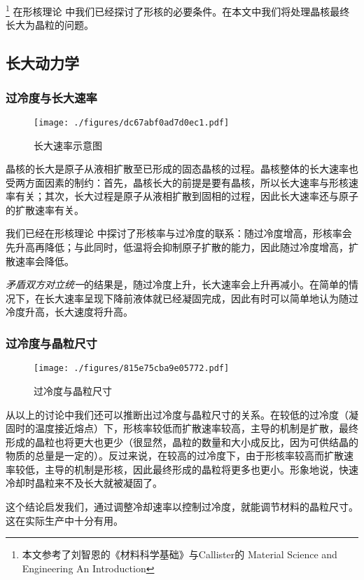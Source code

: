 
\footnote{本文参考了刘智恩的《材料科学基础》与Callister的 Material Science and Engineering An Introduction} 在形核理论  中我们已经探讨了形核的必要条件。在本文中我们将处理晶核最终长大为晶粒的问题。

\subsection{长大动力学}
\subsubsection{过冷度与长大速率}
\begin{figure}[ht]
\centering
\texttt{[image: ./figures/dc67abf0ad7d0ec1.pdf]}
\caption{长大速率示意图} \label{fig_GGRW_1}
\end{figure}

晶核的长大是原子从液相扩散至已形成的固态晶核的过程。晶核整体的长大速率也受两方面因素的制约：首先，晶核长大的前提是要有晶核，所以长大速率与形核速率有关；其次，长大过程是原子从液相扩散到固相的过程，因此长大速率还与原子的扩散速率有关。

我们已经在形核理论  中探讨了形核率与过冷度的联系：随过冷度增高，形核率会先升高再降低；与此同时，低温将会抑制原子扩散的能力，因此随过冷度增高，扩散速率会降低。

\textsl{矛盾双方对立统一}的结果是，随过冷度上升，长大速率会上升再减小。在简单的情况下，在长大速率呈现下降前液体就已经凝固完成，因此有时可以简单地认为随过冷度升高，长大速度将升高。

\subsubsection{过冷度与晶粒尺寸}
\begin{figure}[ht]
\centering
\texttt{[image: ./figures/815e75cba9e05772.pdf]}
\caption{过冷度与晶粒尺寸} \label{fig_GGRW_fig2}
\end{figure}
从以上的讨论中我们还可以推断出过冷度与晶粒尺寸的关系。在较低的过冷度（凝固时的温度接近熔点）下，形核率较低而扩散速率较高，主导的机制是扩散，最终形成的晶粒也将更大也更少（很显然，晶粒的数量和大小成反比，因为可供结晶的物质的总量是一定的）。反过来说，在较高的过冷度下，由于形核率较高而扩散速率较低，主导的机制是形核，因此最终形成的晶粒将更多也更小。形象地说，快速冷却时晶粒来不及长大就被凝固了。

这个结论启发我们，通过调整冷却速率以控制过冷度，就能调节材料的晶粒尺寸。这在实际生产中十分有用。

